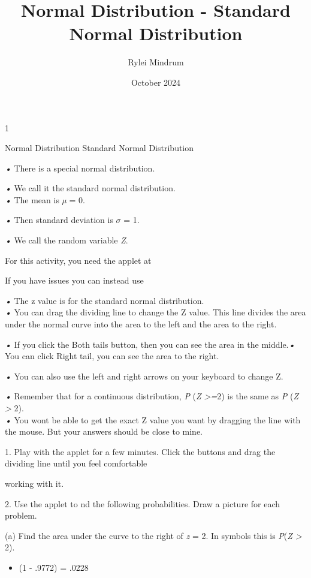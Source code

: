 \documentclass{article}
\author{}
\date{}
\title{Normal Distribution - Standard Normal Distribution}
\author{Rylei Mindrum}
\date{October 2024}
\begin{document}
\maketitle

1

Normal Distribution Standard Normal Distribution

\emph{•} There is a special normal distribution.

\emph{•} We call it the standard normal distribution.\\
\emph{•} The mean is \emph{µ} = 0.

\emph{•} Then standard deviation is \emph{$\sigma$} = 1.

\emph{•} We call the random variable \emph{Z}.

For this activity, you need the applet at

If you have issues you can instead use

\emph{•} The z value is for the standard normal distribution.\\
\emph{•} You can drag the dividing line to change the Z value. This line
divides the area under the normal curve into the area to the left and
the area to the right.

\emph{•} If you click the Both tails button, then you can see the area
in the middle.\emph{•} You can click Right tail, you can see the area to
the right.

\emph{•} You can also use the left and right arrows on your keyboard to
change Z.

\emph{•} Remember that for a continuous distribution, \emph{P} (\emph{Z >=}2) is the same as \emph{P} (\emph{Z \textgreater{}} 2).\\
\emph{•} You won\textquotesingle t be able to get the exact Z value you
want by dragging the line with the mouse. But your answers should be
close to mine.

1. Play with the applet for a few minutes. Click the buttons and drag
the dividing line until you feel comfortable

working with it.

2. Use the applet to nd the following probabilities. Draw a picture for
each problem.

(a) Find the area under the curve to the right of \emph{z} = 2. In
symbols this is \emph{P}(\emph{Z \textgreater{}} 2).
\begin{itemize}
    \item (1 - .9772) = .0228
\end{itemize}
\end{document}

